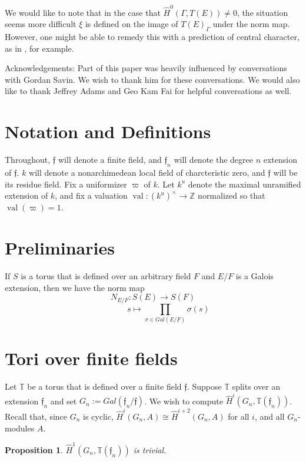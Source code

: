 \documentclass[11pt]{amsart}
\theoremstyle{plain}
\newtheorem{proposition}[theorem]{Proposition}
\theoremstyle{definition}
\DeclareMathOperator{\val}{val}
\begin{document}
We would like to note that in the case that $\hat{H}^0(\Gamma, T(E))
\neq 0$, the situation seems more difficult $\xi$ is defined on the
image of $T(E)_{\Gamma}$ under the norm map.  However, one might be
able to remedy this with a prediction of central character, as in
\cite{grossreeder}, for example.

Acknowledgements: Part of this paper was heavily influenced by
conversations with Gordan Savin.  We wish to thank him for these
conversations.  We would also like to thank Jeffrey Adams and Geo Kam
Fai for helpful conversations as well.

\section{Notation and Definitions}

Throughout, $\mathfrak{f}$ will denote a finite field, and
$\mathfrak{f}_n$ will denote the degree $n$ extension of
$\mathfrak{f}$.  $k$ will denote a nonarchimedean local field of
charcteristic zero, and $\mathfrak{f}$ will be its residue field.  Fix
a uniformizer $\varpi$ of $k$.  Let $k^u$ denote the maximal
unramified extension of $k$, and fix a valuation $\val : (k^u)^\times
\rightarrow \mathbb{Z}$ normalized so that $\val(\varpi) = 1$.

\section{Preliminaries}

If $S$ is a torus that is defined over an arbitrary field $F$ and
$E/F$ is a Galois extension, then we have the norm map
$$N_{E/F} : S(E) \rightarrow S(F)$$ $$\ \ \ \ \ \ \ \ \ \ \ \ \ \ \ \ \ s \mapsto
\prod_{\sigma \in Gal(E/F)} \sigma(s)$$

\section{Tori over finite fields}

Let $\mathbb{T}$ be a torus that is defined over a finite field
$\mathfrak{f}$.  Suppose $\mathbb{T}$ splits over an extension
$\mathfrak{f}_n$ and set $G_n := Gal(\mathfrak{f}_n/\mathfrak{f})$.
We wish to compute $\hat{H}^i(G_n,\mathbb{T}(\mathfrak{f}_n))$.
Recall that, since $G_n$ is cyclic, $\hat{H}^{i}(G_n,A)\cong
\hat{H}^{i+2}(G_n,A)$ for all $i$, and all $G_n$-modules $A$.

\begin{proposition}\label{trivialH1finitefields}
$\hat{H}^1(G_n,\mathbb{T}(\mathfrak{f}_n))$ is trivial.
\end{proposition}
\end{document}
